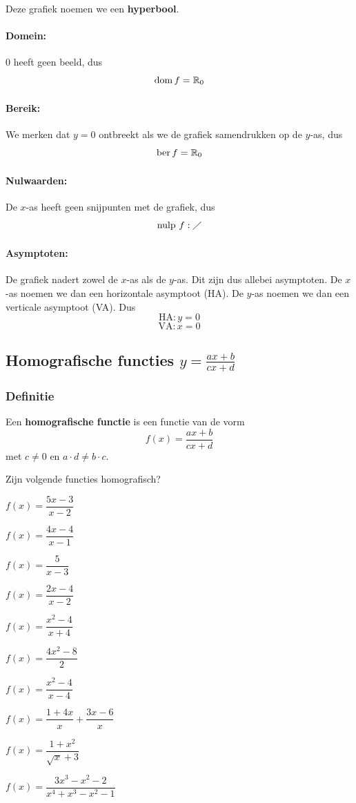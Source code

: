 \documentclass[12pt,twoside,a4paper]{article}
\begin{document}
Deze grafiek noemen we een {\bf hyperbool}.

\paragraph{Domein:}
0 heeft geen beeld, dus
$$\dom f = \mathbb{R}_0$$

\paragraph{Bereik:}
We merken dat $y=0$ ontbreekt als we de grafiek samendrukken op de $y$-as, dus
$$\ber f = \mathbb{R}_0$$
\paragraph{Nulwaarden:}
De $x$-as heeft geen snijpunten met de grafiek, dus
$$\mbox{nulp } f: \diagup$$

\paragraph{Asymptoten:}
De grafiek nadert zowel de $x$-as als de $y$-as. Dit zijn dus allebei asymptoten. De $x$-as noemen we dan een horizontale asymptoot (HA). De $y$-as noemen we dan een verticale asymptoot (VA). Dus
$$\text{HA}: y=0$$
$$\text{VA}: x=0$$

\subsection{Homografische functies $y=\frac{ax+b}{cx+d}$}

\subsubsection{Definitie}
\begin{mdframed}
Een {\bf homografische functie} is een functie van de vorm
$$f(x)=\dfrac{ax+b}{cx+d}$$
met $c\neq 0$ en $a\cdot d\neq b\cdot c$.
\end{mdframed}

\begin{oefening}
Zijn volgende functies homografisch?
\begin{exlist}{2}
  \item $f(x)=\dfrac{5x-3}{x-2}$
  \item $f(x)=\dfrac{4x-4}{x-1}$
  \item $f(x)=\dfrac{5}{x-3}$
  \item $f(x)=\dfrac{2x-4}{x-2}$
  \item $f(x)=\dfrac{x^2-4}{x+4}$
  \item $f(x)=\dfrac{4x^2-8}{2}$
  \item $f(x)=\dfrac{x^2-4}{x-4}$
  \item $f(x)=\dfrac{1+4x}{x}+\dfrac{3x-6}{x}$
  \item $f(x)=\dfrac{1+x^2}{\sqrt{x}+3}$
  \item $f(x)=\dfrac{3x^3-x^2-2}{x^4+x^3-x^2-1}$
\end{exlist}
\end{oefening}
\end{document}
